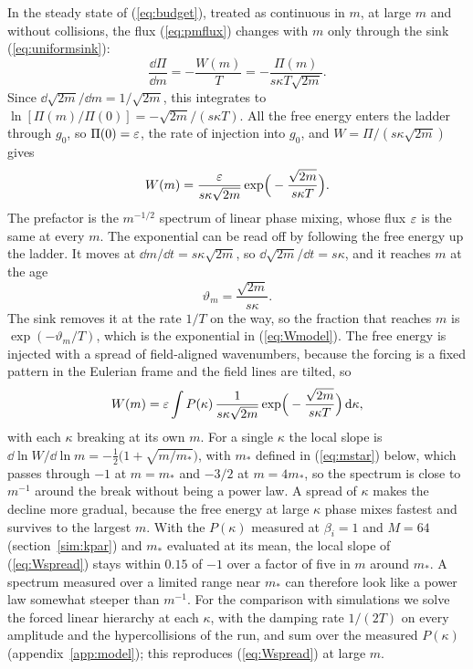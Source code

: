In the steady state of (\ref{eq:budget}), treated as continuous in $m$, at large $m$ and without collisions, the flux (\ref{eq:pmflux}) changes with $m$ only through the sink (\ref{eq:uniformsink}):
\begin{equation}\label{eq:Wbalance}
  \frac{\dd\Pi}{\dd m}=-\frac{W(m)}{T}=-\frac{\Pi(m)}{s\kappa T\sqrt{2m}} .
\end{equation}
Since $\dd\sqrt{2m}/\dd m=1/\sqrt{2m}$, this integrates to $\ln[\Pi(m)/\Pi(0)]=-\sqrt{2m}/(s\kappa T)$. All the free energy enters the ladder through $g_0$, so $\Pi(0)=\varepsilon$, the rate of injection into $g_0$, and $W=\Pi/(s\kappa\sqrt{2m})$ gives
\begin{equation}\label{eq:Wmodel}
  W(m)=\frac{\varepsilon}{s\kappa\sqrt{2m}}\exp\!\Big(-\frac{\sqrt{2m}}{s\kappa T}\Big).
\end{equation}
The prefactor is the $m^{-1/2}$ spectrum of linear phase mixing, whose flux $\varepsilon$ is the same at every $m$. The exponential can be read off by following the free energy up the ladder. It moves at $\dd m/\dd t=s\kappa\sqrt{2m}$, so $\dd\sqrt{2m}/\dd t=s\kappa$, and it reaches $m$ at the age
\begin{equation}\label{eq:age}
  \vartheta_m=\frac{\sqrt{2m}}{s\kappa} .
\end{equation}
The sink removes it at the rate $1/T$ on the way, so the fraction that reaches $m$ is $\exp(-\vartheta_m/T)$, which is the exponential in (\ref{eq:Wmodel}). The free energy is injected with a spread of field-aligned wavenumbers, because the forcing is a fixed pattern in the Eulerian frame and the field lines are tilted, so
\begin{equation}\label{eq:Wspread}
  W(m)=\varepsilon\int P(\kappa)\,\frac{1}{s\kappa\sqrt{2m}}\exp\!\Big(-\frac{\sqrt{2m}}{s\kappa T}\Big)\,\mathrm{d}\kappa ,
\end{equation}
with each $\kappa$ breaking at its own $m$. For a single $\kappa$ the local slope is $\dd\ln W/\dd\ln m=-\tfrac12\big(1+\sqrt{m/m_*}\big)$, with $m_*$ defined in (\ref{eq:mstar}) below, which passes through $-1$ at $m=m_*$ and $-3/2$ at $m=4m_*$, so the spectrum is close to $m^{-1}$ around the break without being a power law. A spread of $\kappa$ makes the decline more gradual, because the free energy at large $\kappa$ phase mixes fastest and survives to the largest $m$. With the $P(\kappa)$ measured at $\beta_i=1$ and $M=64$ (section~\ref{sim:kpar}) and $m_*$ evaluated at its mean, the local slope of (\ref{eq:Wspread}) stays within $0.15$ of $-1$ over a factor of five in $m$ around $m_*$. A spectrum measured over a limited range near $m_*$ can therefore look like a power law somewhat steeper than $m^{-1}$. For the comparison with simulations we solve the forced linear hierarchy at each $\kappa$, with the damping rate $1/(2T)$ on every amplitude and the hypercollisions of the run, and sum over the measured $P(\kappa)$ (appendix~\ref{app:model}); this reproduces (\ref{eq:Wspread}) at large $m$.

